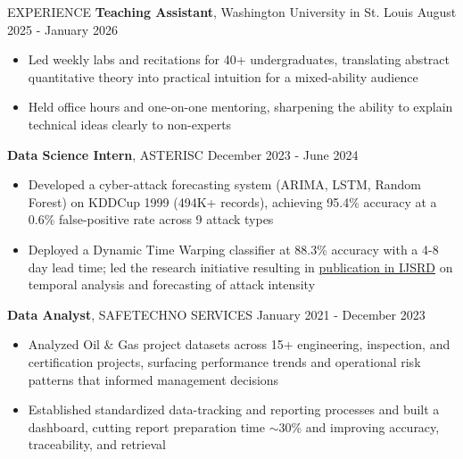 \documentclass{resume}
\begin{document}
\begin{rSection}{\large EXPERIENCE}
\textbf{Teaching Assistant}, Washington University in St. Louis \hfill August 2025 - January 2026
\vspace{-0.5em}
\begin{itemize}[itemsep=1.5pt, topsep=2pt]
    \item Led weekly labs and recitations for 40+ undergraduates, translating abstract quantitative theory into practical intuition for a mixed-ability audience
    \item Held office hours and one-on-one mentoring, sharpening the ability to explain technical ideas clearly to non-experts
\end{itemize}
\vspace{0.15em}

\textbf{Data Science Intern}, ASTERISC \hfill December 2023 - June 2024
\vspace{-0.5em}
\begin{itemize}[itemsep=1.5pt, topsep=2pt]
    \item Developed a cyber-attack forecasting system (ARIMA, LSTM, Random Forest) on KDDCup 1999 (494K+ records), achieving 95.4\% accuracy at a 0.6\% false-positive rate across 9 attack types
    \item Deployed a Dynamic Time Warping classifier at 88.3\% accuracy with a 4-8 day lead time; led the research initiative resulting in {\href{https://mail.ijsrd.com/Article.php?manuscript=IJSRDV12I30191}{publication in IJSRD}} on temporal analysis and forecasting of attack intensity
\end{itemize}
\vspace{0.15em}

\textbf{Data Analyst}, SAFETECHNO SERVICES \hfill January 2021 - December 2023
\vspace{-0.5em}
\begin{itemize}[itemsep=1.5pt, topsep=2pt]
    \item Analyzed Oil \& Gas project datasets across 15+ engineering, inspection, and certification projects, surfacing performance trends and operational risk patterns that informed management decisions
    \item Established standardized data-tracking and reporting processes and built a dashboard, cutting report preparation time $\sim$30\% and improving accuracy, traceability, and retrieval
\end{itemize}
\vspace{-0.6em}
\end{rSection}
\end{document}

